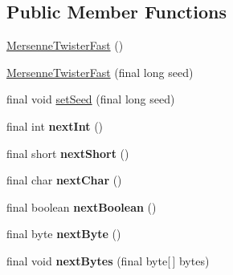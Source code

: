 \subsection*{Public Member Functions}
\begin{CompactItemize}
\item 
\hyperlink{classjenes_1_1utils_1_1_mersenne_twister_fast_7321af0f92bcda7c245ebfbb647f7e4c}{MersenneTwisterFast} ()
\item 
\hyperlink{classjenes_1_1utils_1_1_mersenne_twister_fast_554aee5d390bb57ad30577b194c8b7b2}{MersenneTwisterFast} (final long seed)
\item 
final void \hyperlink{classjenes_1_1utils_1_1_mersenne_twister_fast_a44ca1bf8e9a2f272e248ea279f1e80c}{setSeed} (final long seed)
\item 
\hypertarget{classjenes_1_1utils_1_1_mersenne_twister_fast_063b45fa6e20a5eea9acbe45a8c48ce0}{
final int \textbf{nextInt} ()}
\label{classjenes_1_1utils_1_1_mersenne_twister_fast_063b45fa6e20a5eea9acbe45a8c48ce0}

\item 
\hypertarget{classjenes_1_1utils_1_1_mersenne_twister_fast_89d03c5b1815eff8c443ef081a869e78}{
final short \textbf{nextShort} ()}
\label{classjenes_1_1utils_1_1_mersenne_twister_fast_89d03c5b1815eff8c443ef081a869e78}

\item 
\hypertarget{classjenes_1_1utils_1_1_mersenne_twister_fast_8f7cb8ea9832581729660f5c0346ee3a}{
final char \textbf{nextChar} ()}
\label{classjenes_1_1utils_1_1_mersenne_twister_fast_8f7cb8ea9832581729660f5c0346ee3a}

\item 
\hypertarget{classjenes_1_1utils_1_1_mersenne_twister_fast_54fa48ab055886a90aefdcb816257f4b}{
final boolean \textbf{nextBoolean} ()}
\label{classjenes_1_1utils_1_1_mersenne_twister_fast_54fa48ab055886a90aefdcb816257f4b}

\item 
\hypertarget{classjenes_1_1utils_1_1_mersenne_twister_fast_5e7c0943fcc746a30277f0e09abbf60f}{
final byte \textbf{nextByte} ()}
\label{classjenes_1_1utils_1_1_mersenne_twister_fast_5e7c0943fcc746a30277f0e09abbf60f}

\item 
\hypertarget{classjenes_1_1utils_1_1_mersenne_twister_fast_237dc55841fd8bf544106d052833c374}{
final void \textbf{nextBytes} (final byte\mbox{[}$\,$\mbox{]} bytes)}
\label{classjenes_1_1utils_1_1_mersenne_twister_fast_237dc55841fd8bf544106d052833c374}


\end{CompactItemize}
